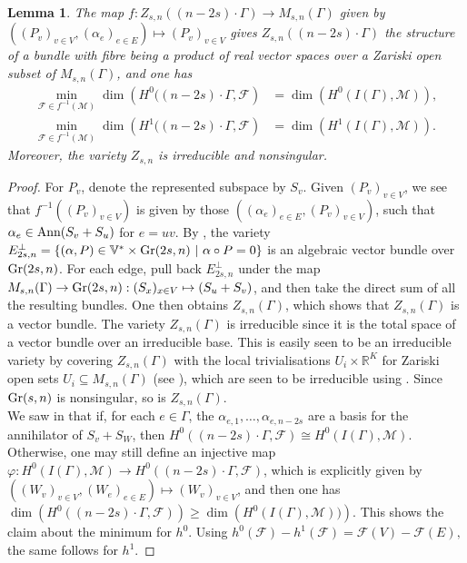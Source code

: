 \documentclass{article}
\newtheorem{lemma}[theorem]{Lemma}
\theoremstyle{definition}
\theoremstyle{remark}
\begin{document}
\begin{lemma}\label{lem: Properties map Z -> M}
     The map $f: Z_{s,n}((n-2s)\cdot \Gamma) \rightarrow M_{s,n}(\Gamma)$ given by $((P_{v})_{v\in V}, (\alpha_{e})_{e\in E})\mapsto (P_{v})_{v\in V}$ gives $Z_{s,n}((n-2s)\cdot \Gamma )$ the structure of a bundle with fibre being a product of real vector spaces over a Zariski open subset of $M_{s,n}(\Gamma)$, and one has
    \begin{align*}
        \min_{\mathcal{F} \in f^{-1}(\mathcal{M})}\dim\left( H^{0}((n-2s)\cdot \Gamma, \mathcal{F}\right) &= \dim\left( H^{0}(I(\Gamma), \mathcal{M})\right),\\
        \min_{\mathcal{F} \in f^{-1}(\mathcal{M})}\dim \left( H^{1}((n-2s)\cdot \Gamma, \mathcal{F}\right)&= \dim\left( H^{1}(I(\Gamma), \mathcal{M})\right).
    \end{align*}
    Moreover, the variety $Z_{s,n}$ is irreducible and nonsingular.
\end{lemma}
\begin{proof}
    For $P_v$, denote the represented subspace by $S_v$.  Given $(P_{v})_{v\in V}$, we see that $f^{-1}((P_{v})_{v\in V})$ is given by those $((\alpha_{e})_{e\in E}, (P_{v})_{v\in V})$, such that $\alpha_{e} \in \textup{Ann}(S_{v} + S_{u})$ for $e=uv$. By \cite[proposition 12.1.4]{Bochnak1998}, the variety $E_{2s,n}^{\perp} = \{ (\alpha,P)\in \mathbb{V}^{*}\times \textup{Gr}(2s, n)~\vert~ \alpha \circ P=0\}$ is an algebraic vector bundle over $ \textup{Gr}(2s, n)$. 
    For each edge, pull back $E_{2s, n}^{\perp}$ under the map $M_{s, n}(\Gamma) \rightarrow \textup{Gr}(2s, n): (S_{x})_{x\in V} \mapsto (S_{u} + S_{v})$, and then take the direct sum of all the resulting bundles. One then obtains $Z_{s, n}(\Gamma)$, which shows that $Z_{s,n}(\Gamma)$ is a vector bundle. The variety $Z_{s,n}(\Gamma)$ is irreducible since it is the total space of a vector bundle over an irreducible base. This is easily seen to be an irreducible variety by covering $Z_{s, n}(\Gamma)$ with the local trivialisations $U_i\times \mathbb{R}^{K}$ for Zariski open sets $U_i \subseteq M_{s,n}(\Gamma)$ (see \cite[Definition 12.1.1]{Bochnak1998}), which are seen to be irreducible using \cite[Theorem 2.8.3 (iii)]{Bochnak1998}. Since $\textup{Gr}(s, n)$ is nonsingular, so is $Z_{s,n}(\Gamma)$.\\
    We saw in  that if, for each $e\in \Gamma$, the $\alpha_{e,1},\dots, \alpha_{e,n-2s}$ are a basis for the annihilator of $S_v +S_W$, then $H^{0}((n-2s)\cdot \Gamma, \mathcal{F}) \cong H^{0}( I(\Gamma), \mathcal{M})$. Otherwise, one may still define an injective map $\varphi: H^{0}(I(\Gamma), \mathcal{M}) \rightarrow H^{0}((n-2s)\cdot \Gamma, \mathcal{F})$, which is explicitly given by $(\left(W_{v}\right)_{v \in V},\left(W_{e}\right)_{e \in E} ) \mapsto (W_{v})_{v\in V}$, and then one has $\dim\left(H^{0}((n-2s)\cdot \Gamma, \mathcal{F})\right)\geq \dim\left(H^{0}(I(\Gamma), \mathcal{M}))\right)$. This shows the claim about the minimum for $h^{0}$. Using $h^{0}(\mathcal{F}) - h^{1}(\mathcal{F}) =  \mathcal{F}(V) - \mathcal{F}(E),$  
    the same follows for $h^{1}$.
\end{proof}
\end{document}
